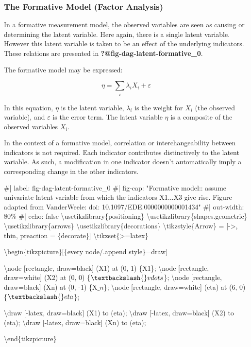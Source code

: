 \documentclass[
  letterpaper,
  DIV=11,
  numbers=noendperiod]{scrartcl}
\newenvironment{Shaded}{\begin{snugshade}}{\end{snugshade}}
\newcommand{\NormalTok}[1]{\textcolor[rgb]{0.00,0.23,0.31}{#1}}
\begin{document}
\hypertarget{the-formative-model-factor-analysis}{%
\subsubsection{The Formative Model (Factor
Analysis)}\label{the-formative-model-factor-analysis}}

In a formative measurement model, the observed variables are seen as
causing or determining the latent variable. Here again, there is a
single latent variable. However this latent variable is taken to be an
effect of the underlying indicators. These relations are presented in
\textbf{?@fig-dag-latent-formative\_0}.

The formative model may be expressed:

\[\eta = \sum_i\lambda_i X_i + \varepsilon\]

In this equation, \(\eta\) is the latent variable, \(\lambda_i\) is the
weight for \(X_i\) (the observed variable), and \(\varepsilon\) is the
error term. The latent variable \(\eta\) is a composite of the observed
variables \(X_i\).

In the context of a formative model, correlation or interchangeability
between indicators is not required. Each indicator contributes
distinctively to the latent variable. As such, a modification in one
indicator doesn't automatically imply a corresponding change in the
other indicators.

\begin{Shaded}
\begin{Highlighting}[]
\NormalTok{\#| label: fig{-}dag{-}latent{-}formative\_0}
\NormalTok{\#| fig{-}cap: "Formative model:: assume univariate latent variable from which the indicators X1...X3 give rise. Figure adapted from VanderWeele: doi: 10.1097/EDE.0000000000001434"}
\NormalTok{\#| out{-}width: 80\%}
\NormalTok{\#| echo: false}
\NormalTok{\textbackslash{}usetikzlibrary\{positioning\}}
\NormalTok{\textbackslash{}usetikzlibrary\{shapes.geometric\}}
\NormalTok{\textbackslash{}usetikzlibrary\{arrows\}}
\NormalTok{\textbackslash{}usetikzlibrary\{decorations\}}
\NormalTok{\textbackslash{}tikzstyle\{Arrow\} = [{-}\textgreater{}, thin, preaction = \{decorate\}]}
\NormalTok{\textbackslash{}tikzset\{\textgreater{}=latex\}}



\NormalTok{\textbackslash{}begin\{tikzpicture\}[\{every node/.append style\}=draw]}

\NormalTok{\textbackslash{}node [rectangle, draw=black] (X1) at (0, 1) \{X1\};}
\NormalTok{\textbackslash{}node [rectangle, draw=white] (X2) at (0, 0) \{$\textbackslash{}vdots$\};}
\NormalTok{\textbackslash{}node [rectangle, draw=black] (Xn) at (0, {-}1) \{X$\_n$\};}
\NormalTok{\textbackslash{}node [rectangle, draw=white] (eta) at (6, 0) \{$\textbackslash{}eta$\};}


\NormalTok{\textbackslash{}draw [{-}latex, draw=black] (X1) to (eta);}
\NormalTok{\textbackslash{}draw [{-}latex, draw=black] (X2) to (eta);}
\NormalTok{\textbackslash{}draw [{-}latex, draw=black] (Xn) to (eta);}

\NormalTok{\textbackslash{}end\{tikzpicture\}}
\end{Highlighting}
\end{Shaded}
\end{document}
